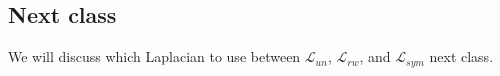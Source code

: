 \documentclass[12pt]{article}
\theoremstyle{plain}
\begin{document}
\subsection{Next class}

We will discuss which Laplacian to use between $\mathcal{L}_{un}$, $\mathcal{L}_{rw}$, and $\mathcal{L}_{sym}$ next class.

{}

\end{document}

